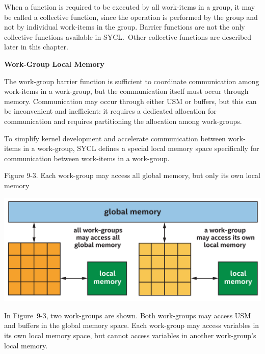 \begin{tcolorbox}[colback=blue!5!white,colframe=blue!75!black, title=COLLECTIVE FUNCTIONS]
When a function is required to be executed by all work-items in a group, it may be called a collective function, since the operation is performed by the group and not by individual work-items in the group. Barrier functions are not the only collective functions available in SYCL. Other collective functions are described later in this chapter.
\end{tcolorbox}

\hspace*{\fill} \par %
\textbf{Work-Group Local Memory}

The work-group barrier function is sufficient to coordinate communication among work-items in a work-group, but the communication itself must occur through memory. Communication may occur through either USM or buffers, but this can be inconvenient and inefficient: it requires a dedicated allocation for communication and requires partitioning the allocation among work-groups.\par

To simplify kernel development and accelerate communication between work-items in a work-group, SYCL defines a special local memory space specifically for communication between work-items in a work-group.\par

\hspace*{\fill} \par %
Figure 9-3. Each work-group may access all global memory, but only its own local memory
\begin{center}
	\includegraphics[width=1.\textwidth]{content/chapter-9/images/4}
\end{center}

In Figure 9-3, two work-groups are shown. Both work-groups may access USM and buffers in the global memory space. Each work-group may access variables in its own local memory space, but cannot access variables in another work-group’s local memory.\par

